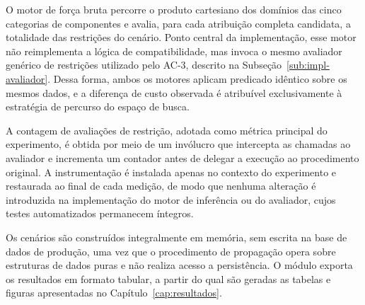 O motor de força bruta percorre o produto cartesiano dos domínios das cinco categorias
de componentes e avalia, para cada atribuição completa candidata, a totalidade das
restrições do cenário. Ponto central da implementação, esse motor não reimplementa a
lógica de compatibilidade, mas invoca o mesmo avaliador genérico de restrições utilizado
pelo AC-3, descrito na Subseção~\ref{sub:impl-avaliador}. Dessa forma, ambos os motores
aplicam predicado idêntico sobre os mesmos dados, e a diferença de custo observada é
atribuível exclusivamente à estratégia de percurso do espaço de busca.

A contagem de avaliações de restrição, adotada como métrica principal do experimento,
é obtida por meio de um invólucro que intercepta as chamadas ao avaliador e incrementa
um contador antes de delegar a execução ao procedimento original. A instrumentação é
instalada apenas no contexto do experimento e restaurada ao final de cada medição, de
modo que nenhuma alteração é introduzida na implementação do motor de inferência ou do
avaliador, cujos testes automatizados permanecem íntegros.

Os cenários são construídos integralmente em memória, sem escrita na base de dados de
produção, uma vez que o procedimento de propagação opera sobre estruturas de dados puras
e não realiza acesso a persistência. O módulo exporta os resultados em formato tabular,
a partir do qual são geradas as tabelas e figuras apresentadas no
Capítulo~\ref{cap:resultados}.
